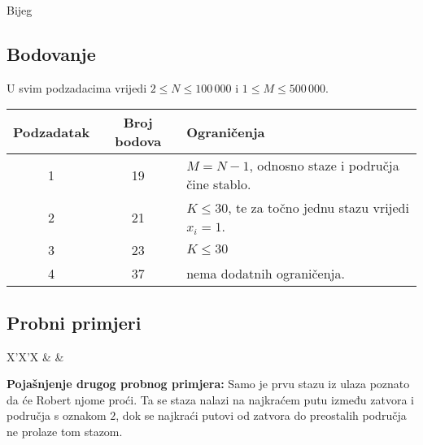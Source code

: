 \begin{statement}[
  problempoints=100,
  timelimit=2 sekunde,
  memorylimit=512 MiB,
]{Bijeg}
\subsection*{Bodovanje}

U svim podzadacima vrijedi $2 \le N \le 100\,000$ i $1 \le M \le 500\,000$.

{\renewcommand{\arraystretch}{1.4}
  \setlength{\tabcolsep}{6pt}
  \begin{tabular}{ccl}
   Podzadatak & Broj bodova & Ograničenja \\ \midrule
    1 & 19 & $M = N - 1$, odnosno staze i područja čine stablo. \\
    2 & 21 & $K \le 30$, te za točno jednu stazu vrijedi $x_i = 1$. \\
    3 & 23 & $K \le 30$ \\
    4 & 37 & nema dodatnih ograničenja.
\end{tabular}}

\subsection*{Probni primjeri}
\begin{tabularx}{\textwidth}{X'X'X}
 &
 &
\end{tabularx}

\textbf{Pojašnjenje drugog probnog primjera: } Samo je prvu stazu
iz ulaza poznato da će Robert njome proći. Ta se staza nalazi na najkraćem
putu između zatvora i područja s oznakom $2$, dok se najkraći putovi od zatvora
do preostalih područja ne prolaze tom stazom.

\end{statement}


